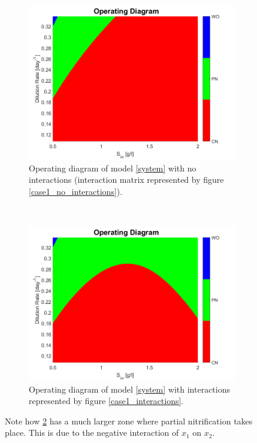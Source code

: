 \documentclass[3p,times]{article}
\begin{document}
\begin{figure}[h]
	\centering
	\begin{subfigure}[b]{0.45\textwidth}
		\includegraphics[width = \textwidth]{Stability/OD_case_study_1_no_interactions}
		\caption{Operating diagram of model \eqref{system} with no interactions (interaction matrix represented by figure \ref{case1_no_interactions}).}
		\label{OD_no_interactions}
	\end{subfigure}
~
	\begin{subfigure}[b]{0.45\textwidth}
	\includegraphics[width = \textwidth]{Stability/OD_case_study_1}
	\caption{Operating diagram of model \eqref{system} with interactions represented by figure \ref{case1_interactions}.}
	\label{OD_interactions}
	\end{subfigure}
	\caption{Note how \ref{OD_interactions} has a much larger zone where partial nitrification takes place. This is due to the negative interaction of $x_1$ on $x_2$.}
	\label{OD_case_1}
\end{figure} 
\clearpage
\end{document}

